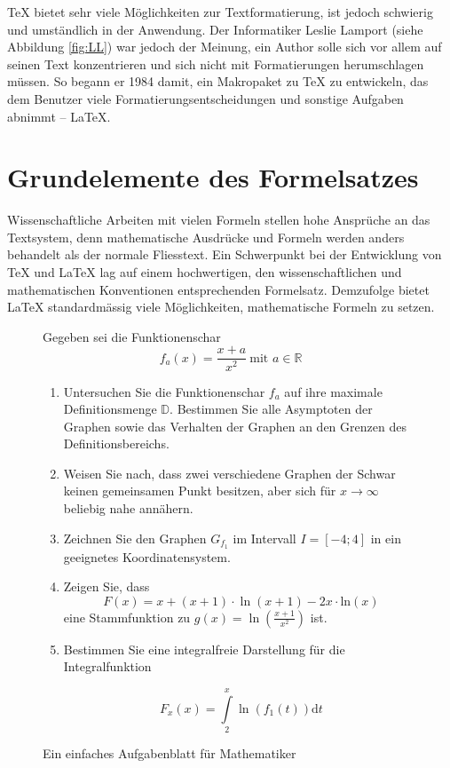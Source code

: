 \documentclass[11pt, a4paper]{article}
\newcommand{\ltx}{\LaTeX}
\begin{document}
\TeX{} bietet sehr viele Möglichkeiten zur Textformatierung, ist jedoch schwierig und umständlich in der Anwendung. Der Informatiker Leslie Lamport (siehe Abbildung \ref{fig:LL}) war jedoch der Meinung, ein Author solle sich vor allem auf seinen Text konzentrieren und sich nicht mit Formatierungen herumschlagen müssen. So begann er 1984 damit, ein Makropaket zu \TeX{} zu entwickeln, das dem Benutzer viele Formatierungsentscheidungen und sonstige Aufgaben abnimmt -- \ltx{}.

\section{Grundelemente des Formelsatzes}

Wissenschaftliche Arbeiten mit vielen Formeln stellen hohe Ansprüche an das Textsystem, denn mathematische Ausdrücke und Formeln werden anders behandelt als der normale Fliesstext. Ein Schwerpunkt bei der Entwicklung von \TeX{} und \ltx{} lag auf einem hochwertigen, den wissenschaftlichen und mathematischen Konventionen entsprechenden Formelsatz. Demzufolge bietet \ltx{} standardmässig viele Möglichkeiten, mathematische Formeln zu setzen.

\begingroup
{}
\begin{figure}[p!] %
Gegeben sei die Funktionenschar
\begin{displaymath}
f_a(x) = \frac{x+a}{x^2}~\mbox{mit } a \in \mathbb{R}
\end{displaymath}
\begin{enumerate}
\item Untersuchen Sie die Funktionenschar \( f_a\) auf ihre maximale Definitionsmenge \(\mathbb{D}\). Bestimmen Sie alle Asymptoten der Graphen sowie das Verhalten der Graphen an den Grenzen des Definitionsbereichs.
\item Weisen Sie nach, dass zwei verschiedene Graphen der Schwar keinen gemeinsamen Punkt besitzen, aber sich für \(x\to\infty\) beliebig nahe annähern.
\item Zeichnen Sie den Graphen \(G_{f_1}\) im Intervall \(I = \left[-4;4\right]\) in ein geeignetes Koordinatensystem.
\item Zeigen Sie, dass
\begin{displaymath}
F(x) = x +(x+1)\cdot\ln(x+1) - 2x\cdot\mbox{ln}(x)
\end{displaymath}
eine Stammfunktion zu \(\displaystyle g(x) = \ln\left(\frac{x+1}{x^2}\right)\) ist.
\item Bestimmen Sie eine integralfreie Darstellung für die Integralfunktion

\[ F_x(x) = \int\limits_2^x\ln(f_1(t))\mathrm{d}t \]
\end{enumerate}
\caption{Ein einfaches Aufgabenblatt für Mathematiker}
\label{fig:formeln}
\end{figure}
\endgroup
\end{document}
